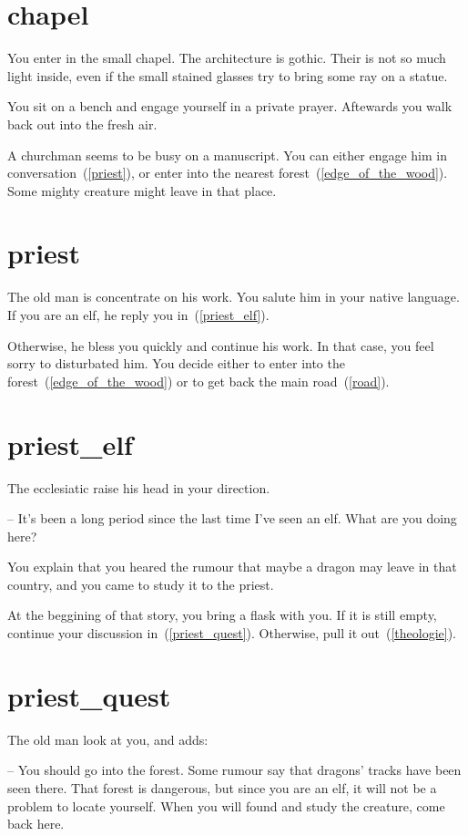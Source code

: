 \section{chapel}

You enter in the small chapel. The architecture is gothic. Their is not so much
light inside, even if the small stained glasses try to bring some ray on a
statue.

You sit on a bench and engage yourself in a private prayer. Aftewards you walk
back out into the fresh air.

A churchman seems to be busy on a manuscript. You can either engage him in
conversation~(\ref{priest}), or enter into the nearest
forest~(\ref{edge_of_the_wood}). Some mighty creature might leave in that place.

\section{priest}

The old man is concentrate on his work. You salute him in your native language.
If you are an elf, he reply you in~(\ref{priest_elf}).

Otherwise, he bless you quickly and continue his work. In that case, you feel
sorry to disturbated him. You decide either to enter into the
forest~(\ref{edge_of_the_wood}) or to get back the main road~(\ref{road}).

\section{priest_elf}

The ecclesiatic raise his head in your direction.

-- It's been a long period since the last time I've seen an elf. What are you
doing here?

You explain that you heared the rumour that maybe a dragon may leave in that
country, and you came to study it to the priest.

At the beggining of that story, you bring a flask with you. If it is still
empty, continue your discussion in~(\ref{priest_quest}). Otherwise, pull it
out~(\ref{theologie}).

\section{priest_quest}

The old man look at you, and adds:

-- You should go into the forest. Some rumour say that dragons' tracks have been
seen there. That forest is dangerous, but since you are an elf, it will not be a
problem to locate yourself. When you will found and study the creature, come
back here.

